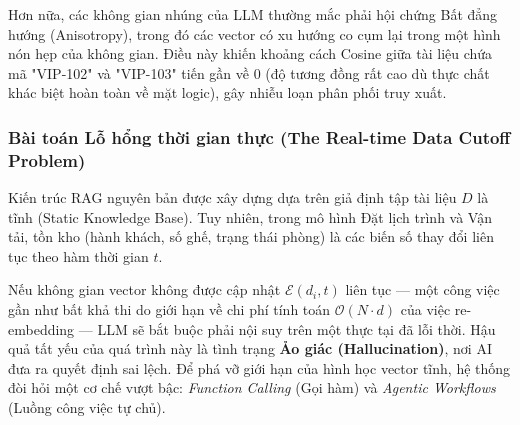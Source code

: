 Hơn nữa, các không gian nhúng của LLM thường mắc phải hội chứng Bất đẳng hướng (Anisotropy), trong đó các vector có xu hướng co cụm lại trong một hình nón hẹp của không gian. Điều này khiến khoảng cách Cosine giữa tài liệu chứa mã "VIP-102" và "VIP-103" tiến gần về 0 (độ tương đồng rất cao dù thực chất khác biệt hoàn toàn về mặt logic), gây nhiễu loạn phân phối truy xuất.

\subsubsection{Bài toán Lỗ hổng thời gian thực (The Real-time Data Cutoff Problem)}
Kiến trúc RAG nguyên bản được xây dựng dựa trên giả định tập tài liệu $D$ là tĩnh (Static Knowledge Base). Tuy nhiên, trong mô hình Đặt lịch trình và Vận tải, tồn kho (hành khách, số ghế, trạng thái phòng) là các biến số thay đổi liên tục theo hàm thời gian $t$. 

Nếu không gian vector không được cập nhật $\mathcal{E}(d_i, t)$ liên tục — một công việc gần như bất khả thi do giới hạn về chi phí tính toán $\mathcal{O}(N \cdot d)$ của việc re-embedding — LLM sẽ bắt buộc phải nội suy trên một thực tại đã lỗi thời. Hậu quả tất yếu của quá trình này là tình trạng \textbf{Ảo giác (Hallucination)}, nơi AI đưa ra quyết định sai lệch. Để phá vỡ giới hạn của hình học vector tĩnh, hệ thống đòi hỏi một cơ chế vượt bậc: \textit{Function Calling} (Gọi hàm) và \textit{Agentic Workflows} (Luồng công việc tự chủ).
